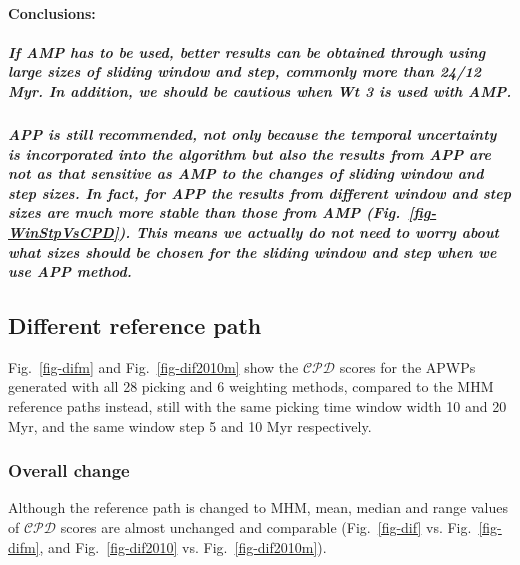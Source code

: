 \paragraph{Conclusions:}

\subparagraph{If AMP has to be used, better results can be obtained through
using large sizes of sliding window and step, commonly more than 24/12 Myr. In
addition, we should be cautious when Wt 3 is used with AMP.}

\subparagraph{APP is still recommended, not only because the temporal
uncertainty is incorporated into the algorithm but also the results from APP are
not as that sensitive as AMP to the changes of sliding window and step sizes. In
fact, for APP the results from different window and step sizes are much more
stable than those from AMP (Fig.~\ref{fig-WinStpVsCPD}). This means we actually
do not need to worry about what sizes should be chosen for the sliding window
and step when we use APP method.}


\subsection{Different reference path}

Fig.~\ref{fig-difm} and Fig.~\ref{fig-dif2010m} show the $\mathcal{CPD}$ scores
for the APWPs generated with all 28 picking and 6 weighting methods, compared to
the MHM reference paths instead, still with the same picking time window width
10 and 20 Myr, and the same window step 5 and 10 Myr respectively.

\subsubsection{Overall change}

Although the reference path is changed to MHM, mean, median and range values of
$\mathcal{CPD}$ scores are almost unchanged and comparable (Fig.~\ref{fig-dif}
vs. Fig.~\ref{fig-difm}, and Fig.~\ref{fig-dif2010} vs.
Fig.~\ref{fig-dif2010m}).

